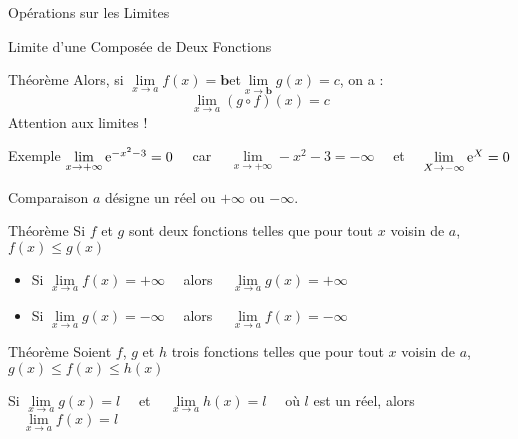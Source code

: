 \documentclass{cours}
\begin{document}
\begin{Gpartie}{Opérations sur les Limites}
\begin{Spartie}{Limite d'une Composée de Deux Fonctions}
\begin{SSpartie}{Théorème}
                Alors, si $\lim\limits_{x\to a}f(x)=\boldsymbol{b}$\quad et\quad$\lim\limits_{x\to\boldsymbol{b}}g(x)=c$, on a : \[\lim\limits_{x\to a}(g\circ f)(x)=c\]
                Attention aux limites !
            \end{SSpartie}
            \begin{SSpartie}{Exemple} 
                $\lim\limits_{x\to+\infty}\mathrm{e}^{-x^2-3}=0\quad$ car $\quad\lim\limits_{x\to+\infty}-x^2-3=-\infty\quad$ et $\quad\lim\limits_{X\to-\infty}\mathrm{e}^X=0$
            \end{SSpartie}
        \end{Spartie}
        \begin{Spartie}{Comparaison} 
            $a$ désigne un réel ou $+\infty$ ou $-\infty$.
            \begin{SSpartie}{Théorème} 
                Si $f$ et $g$ sont deux fonctions telles que pour tout $x$ voisin de $a$, $f(x)\leq g(x)$
                \begin{itemize}
                    \item Si $\lim\limits_{x\to a}f(x)=+\infty\quad$ alors $\quad\lim\limits_{x\to a}g(x)=+\infty$
                    \item Si $\lim\limits_{x\to a}g(x)=-\infty\quad$ alors $\quad\lim\limits_{x\to a}f(x)=-\infty$
                \end{itemize}
            \end{SSpartie}
            \begin{SSpartie}{Théorème} 
                Soient $f$, $g$ et $h$ trois fonctions telles que pour tout $x$ voisin de $a$, $g(x)\leq f(x)\leq h(x)$

                Si $\lim\limits_{x\to a}g(x)=l\quad$ et $\quad\lim\limits_{x\to a}h(x)=l\quad$ où $l$ est un réel, alors $\quad\lim\limits_{x\to a}f(x)=l$
            \end{SSpartie}
        \end{Spartie}
    \end{Gpartie}
\end{document}
